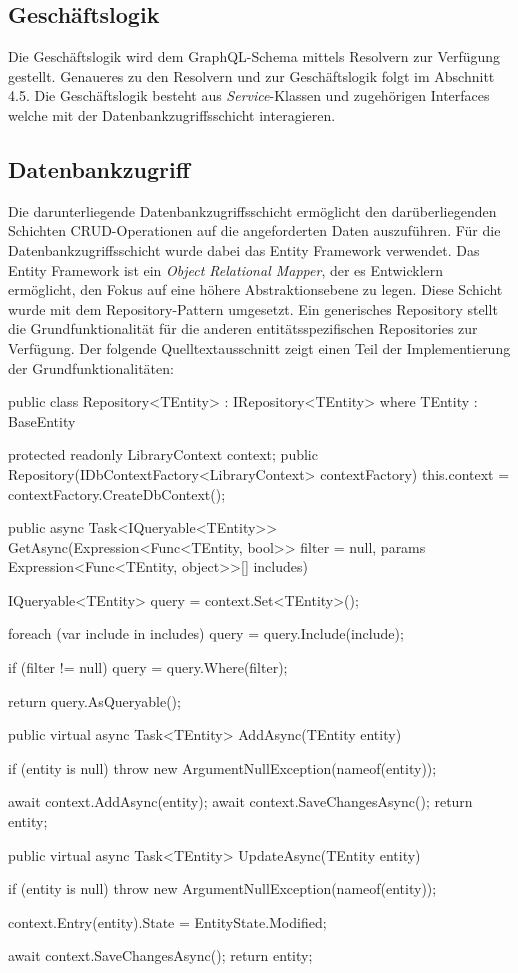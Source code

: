 \subsection{Geschäftslogik}
Die Geschäftslogik wird dem GraphQL-Schema mittels Resolvern zur Verfügung gestellt.
Genaueres zu den Resolvern und zur Geschäftslogik folgt im Abschnitt 4.5.
Die Geschäftslogik besteht aus \textit{Service}-Klassen und zugehörigen Interfaces welche mit der Datenbankzugriffsschicht interagieren.

\subsection{Datenbankzugriff}
Die darunterliegende Datenbankzugriffsschicht ermöglicht den darüberliegenden Schichten CRUD-Operationen auf die angeforderten Daten auszuführen.
Für die Datenbankzugriffsschicht wurde dabei das Entity Framework verwendet.
Das Entity Framework ist ein \textit{Object Relational Mapper}, der es Entwicklern ermöglicht, den Fokus auf eine höhere Abstraktionsebene zu legen.
Diese Schicht wurde mit dem Repository-Pattern umgesetzt.
Ein generisches Repository stellt die Grundfunktionalität für die anderen entitätsspezifischen Repositories zur Verfügung.
Der folgende Quelltextausschnitt zeigt einen Teil der Implementierung der Grundfunktionalitäten:
\begin{JsCode}
public class Repository<TEntity> : IRepository<TEntity> where TEntity : BaseEntity {
    protected readonly LibraryContext context;
    public Repository(IDbContextFactory<LibraryContext> contextFactory) {
        this.context = contextFactory.CreateDbContext();
    }

    public async Task<IQueryable<TEntity>> GetAsync(Expression<Func<TEntity, bool>> filter = null, params Expression<Func<TEntity, object>>[] includes) {
        IQueryable<TEntity> query = context.Set<TEntity>();

        foreach (var include in includes) {
            query = query.Include(include);
        }

        if (filter != null) {
            query = query.Where(filter);
        }

        return query.AsQueryable();
    }

    public virtual async Task<TEntity> AddAsync(TEntity entity) {
        if (entity is null) {
            throw new ArgumentNullException(nameof(entity));
        }

        await context.AddAsync(entity);
        await context.SaveChangesAsync();
        return entity;
    }

    public virtual async Task<TEntity> UpdateAsync(TEntity entity) {
        if (entity is null) {
            throw new ArgumentNullException(nameof(entity));
        }

        context.Entry(entity).State = EntityState.Modified;

        await context.SaveChangesAsync();
        return entity;
    }
}
\end{JsCode}

